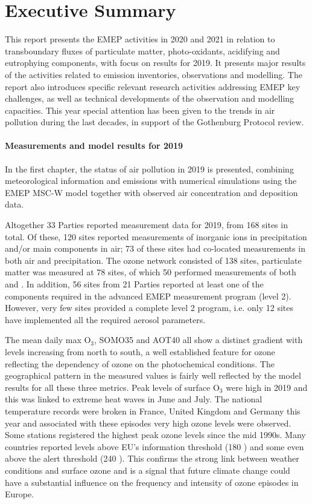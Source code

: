 \chapter*{Executive Summary}


This report presents the EMEP activities in 2020 and 2021 in relation to transboundary
fluxes of particulate matter, photo-oxidants, acidifying and
eutrophying components, with focus on results
for 2019. It presents major results of the activities related to
emission inventories, observations and modelling. The report also
introduces specific relevant research activities addressing EMEP key
challenges, as well as technical developments of the observation and
modelling capacities. This year special attention has been given to the trends in air pollution during the last decades, in support of the Gothenburg Protocol review.

\subsubsection*{Measurements and model results for 2019} %
In the first chapter, the status of air pollution in 2019 is presented, combining 
meteorological information and emissions with numerical simulations using the EMEP MSC-W model together with observed air concentration and deposition data.

Altogether 33 Parties reported measurement data for 2019, from 168 sites in total. 
Of these, 120 sites reported measurements of inorganic ions in precipitation and/or 
main components in air; 73 of these sites had co-located measurements in both air and 
precipitation. The ozone network consisted of 138 sites, particulate matter was measured at 
78 sites, of which 50 performed measurements of both \PM[10] and \PM[2.5]. 
In addition, 56 sites from 21 Parties reported at least one of the components required in the advanced EMEP measurement program (level 2). However, very few sites provided a complete level 2 program, i.e. only 12 sites have implemented all the required aerosol parameters. 

The mean daily max O$_3$, SOMO35 and AOT40 all show a distinct gradient with levels increasing from north to south, a well established feature for ozone reflecting the dependency of ozone on the photochemical conditions. The geographical pattern in the measured values is fairly well reflected by the model results for all these three metrics. Peak levels of surface O$_3$ were high in 2019 and this was linked to extreme heat waves in June and July. The national temperature records were broken in France, United Kingdom and Germany this year and associated with these episodes very high ozone levels were observed. Some stations registered the highest peak ozone levels since the mid 1990s. Many countries reported levels above EU's information threshold (180 \ug) and some even above the alert threshold (240 \ug). This confirms the strong link between weather conditions and surface ozone and is a signal that future climate change could have a substantial influence on the frequency and intensity of ozone episodes in Europe.

